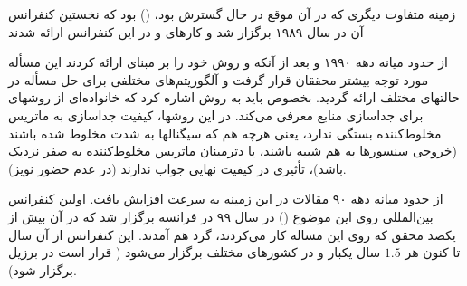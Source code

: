 زمینه متفاوت دیگری که در آن موقع در حال گسترش بود،  
 () بود که نخستین کنفرانس آن در سال  
۱۹۸۹ برگزار شد و کارهای  و   در این کنفرانس ارائه شدند


از حدود میانه دهه ۱۹۹۰ و بعد از آنکه  و  روش خود را بر مبنای
 ارائه کردند  این مسأله مورد توجه بیشتر
محققان قرار گرفت و آلگوریتم‌های مختلفی برای حل مسأله در حالتهای مختلف
ارائه گردید. بخصوص باید به روش اشاره کرد که خانواده‌ای از 
روشهای  برای جداسازی منابع معرفی می‌کند. در این روشها، 
کیفیت جداسازی به   ماتریس مخلوط‌کننده بستگی
ندارد، یعنی هرچه هم که سیگنالها به شدت مخلوط شده باشند (خروجی
سنسورها به هم شبیه باشند، یا دترمینان ماتریس مخلوط‌کننده به صفر نزدیک باشد)، 
تأثیری در کیفیت نهایی جواب ندارند (در عدم حضور نویز).

از حدود میانه دهه ۹۰ مقالات در این زمینه به سرعت افزایش یافت. اولین
کنفرانس بین‌المللی روی این موضوع () در سال ۹۹  در فرانسه برگزار شد 
که در آن بیش از یکصد محقق که روی این مساله کار می‌کردند، 
گرد هم آمدند. این کنفرانس از آن سال تا کنون هر $1.5$ سال یکبار و
در کشورهای مختلف برگزار می‌شود ( قرار است در برزیل برگزار شود).

